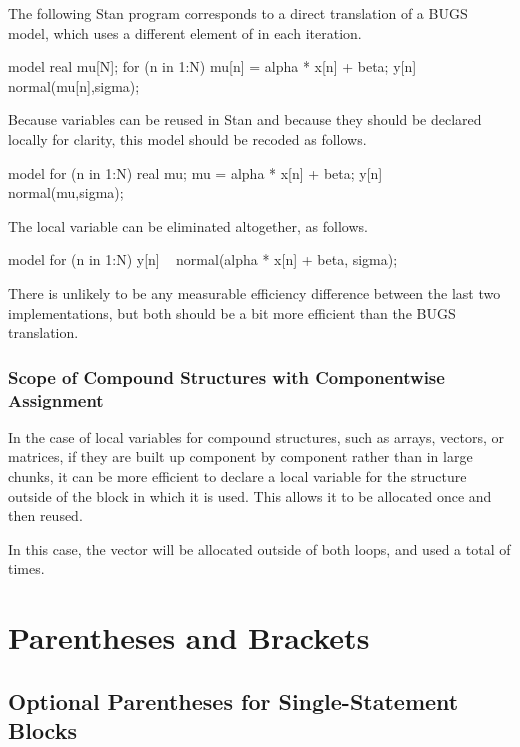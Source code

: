 The following Stan program corresponds to a direct translation of a
BUGS model, which uses a different element of  in each
iteration.
%
\begin{stancode}
model {
  real mu[N];
  for (n in 1:N) {
    mu[n] = alpha * x[n] + beta;
    y[n] ~ normal(mu[n],sigma);
  }
}
\end{stancode}
%
Because variables can be reused in Stan and because they should be
declared locally for clarity, this model should be recoded as follows.
%
\begin{stancode}
model {
  for (n in 1:N) {
    real mu;
    mu = alpha * x[n] + beta;
    y[n] ~ normal(mu,sigma);
  }
}
\end{stancode}
%
The local variable can be eliminated altogether, as follows.
%
\begin{stancode}
model {
  for (n in 1:N)
    y[n] ~ normal(alpha * x[n] + beta, sigma);
}
\end{stancode}
%
There is unlikely to be any measurable efficiency difference
between the last two implementations, but both should be a bit
more efficient than the BUGS translation.

\subsubsection{Scope of Compound Structures with Componentwise Assignment}

In the case of local variables for compound structures, such as
arrays, vectors, or matrices, if they are built up component by
component rather than in large chunks, it can be more efficient to
declare a local variable for the structure outside of the block
in which it is used.  This allows it to be allocated once and then
reused.
%
\begin{stancode}
model {
  vector[K] mu;
  for (n in 1:N) {
    for (k in 1:K)
      mu[k] = ...;
    y[n] ~ multi_normal(mu,Sigma);
}
\end{stancode}
%
In this case, the vector  will be allocated
outside of both loops, and used a total of  times.

\section{Parentheses and Brackets}

\subsection{Optional Parentheses for Single-Statement Blocks}

